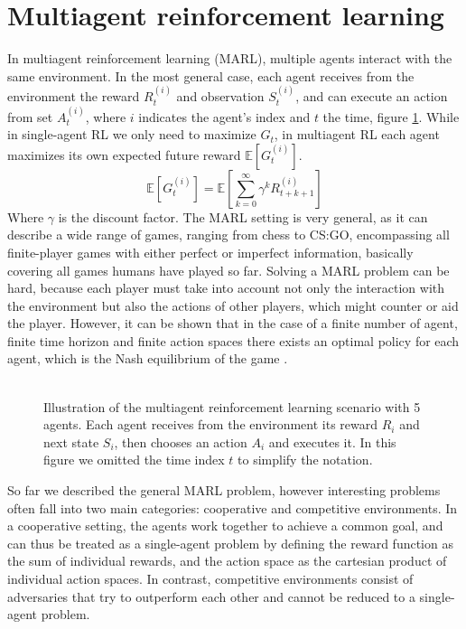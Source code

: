 \section{Multiagent reinforcement learning}
In multiagent reinforcement learning (MARL), multiple agents interact with the same environment. In the most general case, each agent receives from the environment the reward $R_t^{(i)}$ and observation $S_t^{(i)}$, and can execute an action from set $A_t^{(i)}$, where $i$ indicates the agent's index and $t$ the time, figure \ref{fig:marl}. While in single-agent RL we only need to maximize $G_t$, in multiagent RL each agent maximizes its own expected future reward $\mathbb{E}[G_t^{(i)}]$.
\begin{equation}
    \mathbb{E}[G_t^{(i)}] = \mathbb{E}\left[ \sum_{k=0}^{\infty} \gamma^{k} R_{t+k+1}^{(i)} \right]
    \label{eq:marl-gt}
\end{equation}    
Where $\gamma$ is the discount factor.
The MARL setting is very general, as it can describe a wide range of games, ranging from chess to CS:GO, encompassing all finite-player games with either perfect or imperfect information, basically covering all games humans have played so far. Solving a MARL problem can be hard, because each player must take into account not only the interaction with the environment but also the actions of other players, which might counter or aid the player. However, it can be shown that in the case of a finite number of agent, finite time horizon and finite action spaces there exists an optimal policy for each agent, which is the Nash equilibrium of the game \cite{nash-equilibrium-wikipedia}.\\\\
\begin{figure}[H]
    \centering
    
    \caption{Illustration of the multiagent reinforcement learning scenario with 5 agents. Each agent receives from the environment its reward $R_i$ and next state $S_i$, then chooses an action $A_i$ and executes it. In this figure we omitted the time index $t$ to simplify the notation.}
    \label{fig:marl}
\end{figure}
So far we described the general MARL problem, however interesting problems often fall into two main categories: cooperative and competitive environments. In a cooperative setting, the agents work together to achieve a common goal, and can thus be treated as a single-agent problem by defining the reward function as the sum of individual rewards, and the action space as the cartesian product of individual action spaces. In contrast, competitive environments consist of adversaries that try to outperform each other and cannot be reduced to a single-agent problem.\\\\
